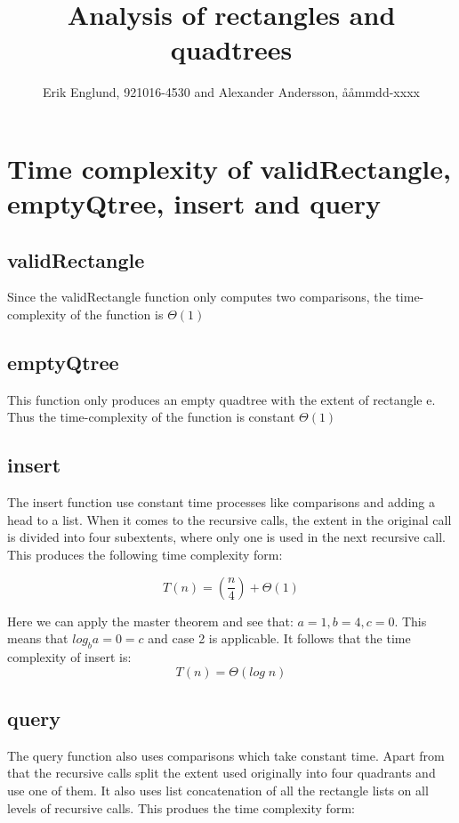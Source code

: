\documentclass[12pt, a4paper]{article}
\title{Analysis of rectangles and quadtrees}
\author{Erik Englund, 921016-4530 and Alexander Andersson, ååmmdd-xxxx}
\begin{document}
\maketitle

\section{Time complexity of validRectangle, emptyQtree, insert and query}

\subsection{validRectangle}

Since the validRectangle function only computes two comparisons, the time-complexity of the function is 
$\Theta(1)$




\subsection{emptyQtree}

This function only produces an empty quadtree with the extent of rectangle e. Thus the time-complexity of the function is constant $\Theta(1)$



\subsection{insert}

The insert function use constant time processes like comparisons and adding a head to a list. When it comes to the recursive calls, the extent in the original call is divided into four subextents, where only one is used in the next recursive call. This produces the following time complexity form:

$$T(n)=\left(\frac{n}{4}\right)+\Theta(1)$$

Here we can apply the master theorem and see that: $a=1, b=4, c=0$. This means that $log_ba=0 = c$ and case 2 is applicable. It follows that the time complexity of insert is: $$T(n)=\Theta(log\;n)$$





\subsection{query}

The query function also uses comparisons which take constant time. Apart from that the recursive calls split the extent used originally into four quadrants and use one of them. It also uses list concatenation of all the rectangle lists on all levels of recursive calls. This produes the time complexity form:
\end{document}
